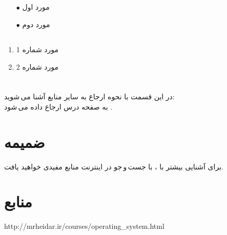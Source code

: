 \documentclass{article}
\begin{document}
\subsection{}
\begin{itemize}
    \item [$\bullet$] مورد اول
    \item [$\bullet$] مورد دوم
\end{itemize}
\subsection{}
\begin{enumerate}
    \item مورد شماره 1
    \item مورد شماره 2
\end{enumerate}

\section{}
در این قسمت با نحوه ارجاع به سایر منابع آشنا می\,شوید:\\
\indent
به صفحه درس ارجاع داده می\,شود \cite{b1}.

\section{ضمیمه}
برای آشنایی بیشتر با \lr{\LaTeX}، با جست\,و\,جو در اینترنت منابع مفیدی خواهید یافت.


\section*{منابع}
\renewcommand{\section}[2]{}%
\begin{thebibliography}{99} %


\begin{LTRitems}

\resetlatinfont

 http://mrheidar.ir/courses/operating\_system.html
\end{LTRitems}

\end{thebibliography}
\end{document}
